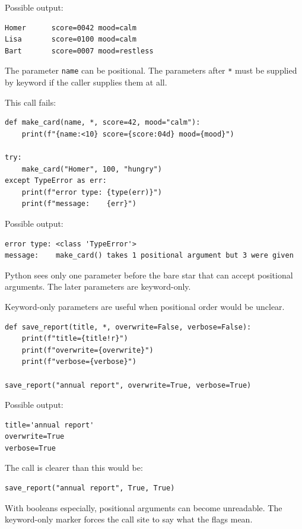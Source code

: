 Possible output:

\begin{verbatim}
Homer      score=0042 mood=calm
Lisa       score=0100 mood=calm
Bart       score=0007 mood=restless
\end{verbatim}

The parameter \texttt{name} can be positional. The parameters after \texttt{*} must be supplied by keyword if the caller supplies them at all.

This call fails:

\begin{verbatim}
def make_card(name, *, score=42, mood="calm"):
    print(f"{name:<10} score={score:04d} mood={mood}")

try:
    make_card("Homer", 100, "hungry")
except TypeError as err:
    print(f"error type: {type(err)}")
    print(f"message:    {err}")
\end{verbatim}

Possible output:

\begin{verbatim}
error type: <class 'TypeError'>
message:    make_card() takes 1 positional argument but 3 were given
\end{verbatim}

Python sees only one parameter before the bare star that can accept positional arguments. The later parameters are keyword-only.

Keyword-only parameters are useful when positional order would be unclear.

\begin{verbatim}
def save_report(title, *, overwrite=False, verbose=False):
    print(f"title={title!r}")
    print(f"overwrite={overwrite}")
    print(f"verbose={verbose}")

save_report("annual report", overwrite=True, verbose=True)
\end{verbatim}

Possible output:

\begin{verbatim}
title='annual report'
overwrite=True
verbose=True
\end{verbatim}

The call is clearer than this would be:

\begin{verbatim}
save_report("annual report", True, True)
\end{verbatim}

With booleans especially, positional arguments can become unreadable. The keyword-only marker forces the call site to say what the flags mean.

